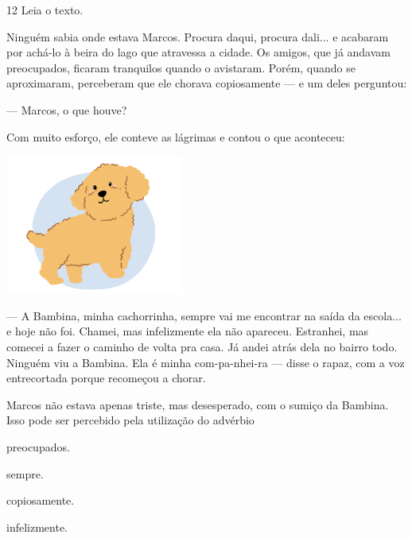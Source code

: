 \pagebreak

\num{12} Leia o texto.

\begin{myquote}
Ninguém sabia onde estava Marcos. Procura daqui, procura dali... e
acabaram por achá-lo à beira do lago que atravessa a cidade. Os amigos,
que já andavam preocupados, ficaram tranquilos quando o avistaram.
Porém, quando se aproximaram, perceberam que ele chorava copiosamente
--- e um deles perguntou:

--- Marcos, o que houve?

Com muito esforço, ele conteve as lágrimas e contou o que aconteceu:

\begin{center}
\includegraphics[width=.7\textwidth]{./media/image23v.png}
\end{center}

--- A Bambina, minha cachorrinha, sempre vai me encontrar na saída da
escola... e hoje não foi. Chamei, mas infelizmente ela não apareceu.
Estranhei, mas comecei a fazer o caminho de volta pra casa. Já andei
atrás dela no bairro todo. Ninguém viu a Bambina. Ela é minha
com-pa-nhei-ra --- disse o rapaz, com a voz entrecortada porque
recomeçou a chorar.

\end{myquote}

Marcos não estava apenas triste, mas desesperado, com o sumiço da
Bambina. Isso pode ser percebido pela utilização do advérbio

\begin{escolha}
\begin{multicols}{2}
\item preocupados.

\item sempre.

\item copiosamente.

\item infelizmente.
\end{multicols}
\end{escolha}

